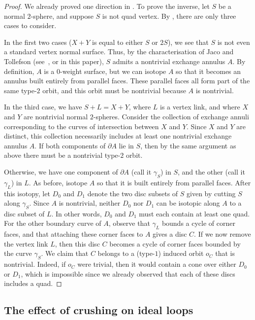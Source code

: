 \documentclass[10pt,a4paper]{amsart}
\begin{document}
\begin{proof}
We already proved one direction in .
To prove the inverse, let $S$ be a normal $2$-sphere, and suppose $S$ is not quad vertex.
By , there are only three cases to consider.

In the first two cases ($X+Y$ is equal to either $S$ or $2S$), we see that $S$ is not even a standard vertex normal surface.
Thus, by the characterisation of Jaco and Tollefson (see~\cite[Theorem~4.1]{jaco1995algorithms}, or
 in this paper), $S$ admits a nontrivial exchange annulus $A$.
By definition, $A$ is a $0$-weight surface, but we can isotope $A$ so that it becomes an annulus built entirely from parallel faces.
These parallel faces all form part of the same type-$2$ orbit, and this orbit must be nontrivial because $A$ is nontrivial.

In the third case, we have $S+L = X+Y$, where $L$ is a vertex link, and where $X$ and $Y$ are nontrivial normal $2$-spheres.
Consider the collection of exchange annuli corresponding to the curves of intersection between $X$ and $Y$.
Since $X$ and $Y$ are distinct, this collection necessarily includes at least one nontrivial exchange annulus $A$.
If both components of $\partial A$ lie in $S$, then by the same argument as above there must be a nontrivial type-$2$ orbit.

Otherwise, we have one component of $\partial A$ (call it $\gamma_S$) in $S$, and the other (call it $\gamma_L$) in $L$.
As before, isotope $A$ so that it is built entirely from parallel faces.
After this isotopy, let $D_0$ and $D_1$ denote the two disc subsets of $S$ given by cutting $S$ along $\gamma_S$.
Since $A$ is nontrivial, neither $D_0$ nor $D_1$ can be isotopic along $A$ to a disc subset of $L$.
In other words, $D_0$ and $D_1$ must each contain at least one quad.
For the other boundary curve of $A$, observe that $\gamma_L$ bounds a cycle of corner faces, and that attaching these corner faces to $A$ gives a disc $C$.
If we now remove the vertex link $L$, then this disc $C$ becomes a cycle of corner faces bounded by the curve $\gamma_S$.
We claim that $C$ belongs to a (type-$1$) induced orbit $o_C$ that is nontrivial.
Indeed, if $o_C$ were trivial, then it would contain a cone over either $D_0$ or $D_1$, which is impossible since we already observed that each of these discs includes a quad.
\end{proof}

\subsection{The effect of crushing on ideal loops}\label{ssec:crushIdealLoop}
\end{document}
